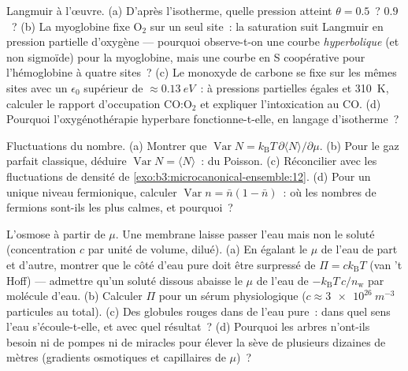 \begin{exercise}[$\star\star$]\label{exo:b3:grand-canonical:6}
Langmuir à l'œuvre. (a) D'après l'isotherme, quelle pression atteint
$\theta = 0.5$~? $0.9$~? (b) La myoglobine fixe O$_2$ sur un seul
site~: la saturation suit Langmuir en pression partielle d'oxygène ---
pourquoi observe-t-on une courbe \emph{hyperbolique} (et non
sigmoïde) pour la myoglobine, mais une courbe en S coopérative pour
l'hémoglobine à quatre sites~? (c) Le monoxyde de carbone se fixe sur
les mêmes sites avec un $\epsilon_0$ supérieur de
$\approx\qty{0.13}{eV}$~: à pressions partielles égales et
\qty{310}{K}, calculer le rapport d'occupation CO:O$_2$ et expliquer
l'intoxication au CO. (d) Pourquoi l'oxygénothérapie hyperbare
fonctionne-t-elle, en langage d'isotherme~?
\end{exercise}

\begin{exercise}[$\star\star$]\label{exo:b3:grand-canonical:7}
Fluctuations du nombre. (a) Montrer que $\operatorname{Var}N =
k_{\text{B}}T\,\partial\langle N\rangle/\partial\mu$. (b) Pour le gaz
parfait classique, déduire $\operatorname{Var}N = \langle
N\rangle$~: du Poisson. (c) Réconcilier avec les fluctuations de
densité de \cref{exo:b3:microcanonical-ensemble:12}. (d) Pour un
unique niveau fermionique, calculer $\operatorname{Var}n = \bar n(1 - \bar
n)$~: où les nombres de fermions sont-ils les plus calmes, et
pourquoi~?
\end{exercise}

\begin{exercise}[$\star\star$]\label{exo:b3:grand-canonical:8}
L'osmose à partir de $\mu$. Une membrane laisse passer l'eau mais non
le soluté (concentration $c$ par unité de volume, dilué). (a) En
égalant le $\mu$ de l'eau de part et d'autre, montrer que le côté
d'eau pure doit être surpressé de $\Pi = ck_{\text{B}}T$ (van 't
Hoff) --- admettre qu'un soluté dissous abaisse le $\mu$ de l'eau de
$-k_{\text{B}}T\,c/n_{\text{w}}$ par molécule d'eau. (b) Calculer
$\Pi$ pour un sérum physiologique ($c \approx \qty{3e26}{m^{-3}}$
particules au total). (c) Des globules rouges dans de l'eau pure~:
dans quel sens l'eau s'écoule-t-elle, et avec quel résultat~? (d)
Pourquoi les arbres n'ont-ils besoin ni de pompes ni de miracles pour
élever la sève de plusieurs dizaines de mètres (gradients osmotiques
et capillaires de $\mu$)~?
\end{exercise}

